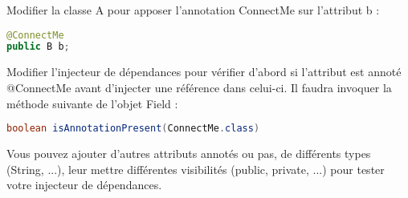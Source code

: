 \documentclass[11pt]{article}
\begin{document}
Modifier la classe A pour apposer l'annotation ConnectMe sur l'attribut b :
\begin{lstlisting}[language=Java,basicstyle=\scriptsize]
@ConnectMe
public B b;
\end{lstlisting}

Modifier l'injecteur de dépendances pour vérifier d'abord si
l'attribut est annoté @ConnectMe avant d'injecter une référence dans
celui-ci. Il faudra invoquer la méthode suivante de l'objet Field :
\begin{lstlisting}[language=Java,basicstyle=\scriptsize]
boolean isAnnotationPresent(ConnectMe.class)
\end{lstlisting}

Vous pouvez ajouter d'autres attributs annotés ou pas, de différents
types (String, ...), leur mettre différentes visibilités (public,
private, ...) pour tester votre injecteur de dépendances.
\end{document}

